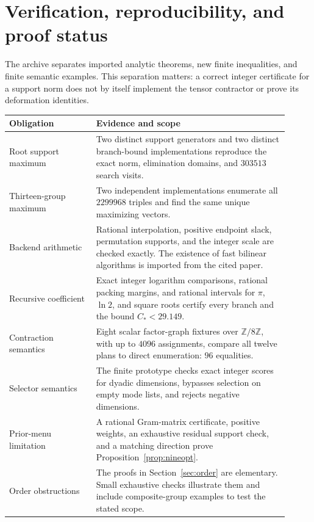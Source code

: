 \section{Verification, reproducibility, and proof status}\label{sec:verification}

The archive separates imported analytic theorems, new finite inequalities,
and finite semantic examples. This separation matters: a correct integer
certificate for a support norm does not by itself implement the tensor
contractor or prove its deformation identities.

\begin{center}\small
\begin{tabular}{@{}p{0.29\linewidth}p{0.62\linewidth}@{}}
\toprule
Obligation & Evidence and scope\\
\midrule
Root support maximum & Two distinct support generators and two distinct
branch-bound implementations reproduce the exact norm, elimination
domains, and \(303513\) search visits.\\[3pt]
Thirteen-group maximum & Two independent implementations enumerate all
\(2299968\) triples and find the same unique maximizing vectors.\\[3pt]
Backend arithmetic & Rational interpolation, positive endpoint slack,
permutation supports, and the integer scale are checked exactly. The
existence of fast bilinear algorithms is imported from the cited paper.\\[3pt]
Recursive coefficient & Exact integer logarithm comparisons, rational
packing margins, and rational intervals for \(\pi\), \(\ln2\), and square
roots certify every branch and the bound \(C_*<29.149\).\\[3pt]
Contraction semantics & Eight scalar factor-graph fixtures over
\(\mathbb Z/8\mathbb Z\), with up to \(4096\) assignments, compare all
twelve plans to direct enumeration: \(96\) equalities.\\[3pt]
Selector semantics & The finite prototype checks exact integer scores
for dyadic dimensions, bypasses selection on empty mode lists, and
rejects negative dimensions.\\[3pt]
Prior-menu limitation & A rational Gram-matrix certificate, positive
weights, an exhaustive residual support check, and a matching direction
prove Proposition~\ref{prop:nineopt}.\\[3pt]
Order obstructions & The proofs in Section~\ref{sec:order} are elementary.
Small exhaustive checks illustrate them and include composite-group
examples to test the stated scope.\\
\bottomrule
\end{tabular}
\end{center}

